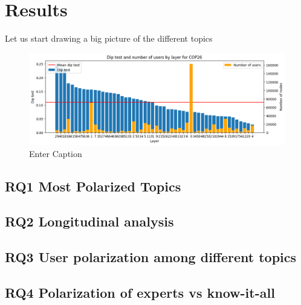 \chapter{Results}%
Let us start drawing a big picture of the different topics 

\begin{figure}
    \centering
    \includegraphics[width=0.95\linewidth]{Chapter5//figures/diptest_cop26.png}
    \caption{Enter Caption}
    \label{fig:diptest}
\end{figure}

\section{RQ1 Most Polarized Topics}




\section{RQ2 Longitudinal analysis}



\section{RQ3 User polarization among different topics}


\section{RQ4 Polarization of experts vs know-it-all }
